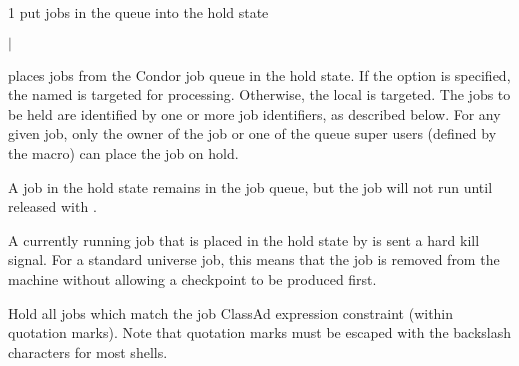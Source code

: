 \begin{ManPage}{\label{man-condor-hold}}{1}
{put jobs in the queue into the hold state}
\Synopsis {}
\ToolArgsBase

\ToolDebugOption
{}
\ToolLocate 
\ToolJobs
$|$  \Dots 

\ToolDebugOption
{}
\ToolLocate 
\ToolAll


\Description

 places jobs from the Condor job queue in
the hold state.
If the  option is specified, the named  is targeted
for processing.  
Otherwise, the local  is targeted.
The jobs to be held are identified by one or more job identifiers, as
described below.
For any given job, only the owner of the job or one of the queue super users
(defined by the  macro) can place the job on hold.

A job in the hold state remains in the job queue,
but the job will not run until released with .

A currently running job that is placed in the hold state by 
is sent a hard kill signal.
For a standard universe job,
this means that the job is removed from the machine without
allowing a checkpoint to be produced first.

\begin{Options}

  \ToolArgsBaseDesc
  \ToolLocateDesc
  \ToolDebugDesc
   {Hold all jobs which match
    the job ClassAd expression constraint (within quotation
    marks).
    Note that quotation marks must be escaped with the
    backslash characters for most shells.  }

\end{Options}


\end{ManPage}
